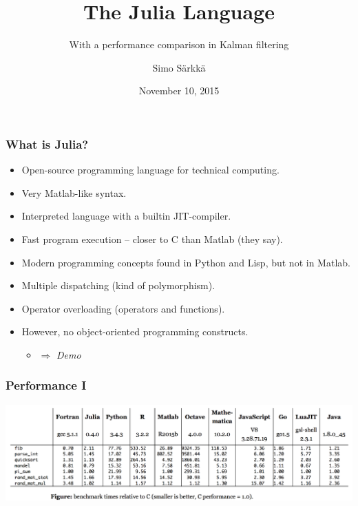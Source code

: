 \documentclass[xcolor=svgnames,english,handout]{beamer}
\title{The Julia Language}
\subtitle{With a performance comparison in Kalman filtering}
\author{Simo S\"arkk\"a}
\institute{Aalto University} %
\date{November 10, 2015}
\begin{document}

\begin{frame}
  \titlepage
\end{frame}



\begin{frame}
  \frametitle{What is Julia?}

  \begin{itemize}[<+->]       
  \item Open-source \alert{programming language} for technical computing.
  \item Very \alert{Matlab-like} syntax.
  \item Interpreted language with a builtin \alert{JIT-compiler}.
  \item \alert{Fast program execution} -- closer to C than Matlab (they say).
  \item \alert{Modern programming concepts} found in Python and Lisp, but not in Matlab.
  \item \alert{Multiple dispatching} (kind of polymorphism).
  \item \alert{Operator overloading} (operators and functions).
  \item However, \alert{no object-oriented programming} constructs.
  \begin{itemize}[<+->]       
  \item $\Rightarrow$ {\it Demo}
  \end{itemize}
  \end{itemize}

\end{frame}

\begin{frame}
  \frametitle{Performance I}
  \centering
  \includegraphics[width=\textwidth]{perf}
\end{frame}
\end{document}
